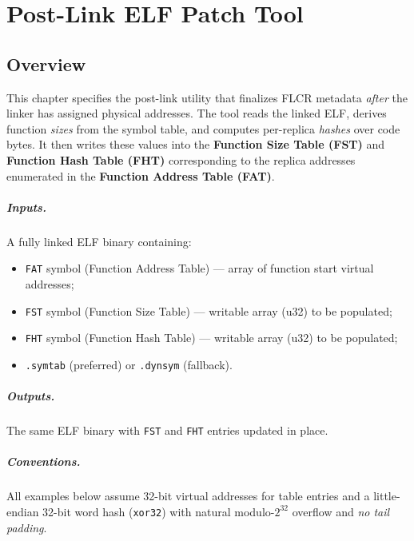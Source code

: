 \chapter{Post-Link ELF Patch Tool}
\label{chap:postlink-elf-patch}

\section{Overview}
This chapter specifies the post-link utility that finalizes FLCR metadata
\emph{after} the linker has assigned physical addresses. The tool reads the
linked ELF, derives function \emph{sizes} from the symbol table, and computes
per-replica \emph{hashes} over code bytes. It then writes these values into the
\textbf{Function Size Table (FST)} and \textbf{Function Hash Table (FHT)}
corresponding to the replica addresses enumerated in the
\textbf{Function Address Table (FAT)}.

\paragraph{Inputs.}
A fully linked ELF binary containing:
\begin{itemize}
  \item \texttt{FAT} symbol (Function Address Table) — array of function start virtual addresses;
  \item \texttt{FST} symbol (Function Size Table) — writable array (u32) to be populated;
  \item \texttt{FHT} symbol (Function Hash Table) — writable array (u32) to be populated;
  \item \texttt{.symtab} (preferred) or \texttt{.dynsym} (fallback).
\end{itemize}

\paragraph{Outputs.}
The same ELF binary with \texttt{FST} and \texttt{FHT} entries updated in place.

\paragraph{Conventions.}
All examples below assume 32-bit virtual addresses for table entries and a
little-endian 32-bit word hash (\texttt{xor32}) with natural modulo-$2^{32}$
overflow and \emph{no tail padding}.

